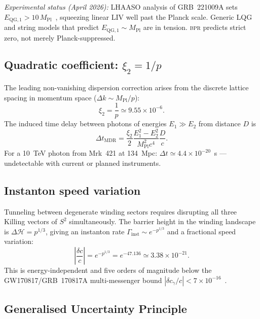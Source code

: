 \documentclass[aps,prd,twocolumn,superscriptaddress,longbibliography,nofootinbib]{revtex4-2}
\newcommand{\Stwo}{S^2}
\newcommand{\MPl}{M_{\mathrm{Pl}}}
\newcommand{\bpr}{\textsc{bpr}}
\newcommand{\abs}[1]{\left|#1\right|}
\begin{document}
\textit{Experimental status (April 2026):} LHAASO analysis of GRB~221009A
sets $E_{\mathrm{QG},1} > 10\,\MPl$~\cite{LHAASO2024}, squeezing linear LIV
well past the Planck scale.  Generic LQG and string models that predict
$E_{\mathrm{QG},1} \sim \MPl$ are in tension.  \bpr{} predicts strict zero,
not merely Planck-suppressed.

\subsection{Quadratic coefficient: $\xi_2 = 1/p$}

The leading non-vanishing dispersion correction arises from the discrete
lattice spacing in momentum space ($\Delta k \sim \MPl/p$):
\begin{equation}
\xi_2 = \frac{1}{p} \simeq 9.55 \times 10^{-6}.
\label{eq:xi2}
\end{equation}
The induced time delay between photons of energies $E_1 \gg E_2$ from
distance $D$ is
\begin{equation}
\Delta t_{\mathrm{MDR}} = \frac{\xi_2}{2}
  \frac{E_1^2 - E_2^2}{\MPl^2 c^4}\frac{D}{c}.
\end{equation}
For a 10~TeV photon from Mrk~421 at 134~Mpc: $\Delta t \simeq 4.4\times10^{-20}$~s
--- undetectable with current or planned instruments.

\subsection{Instanton speed variation}

Tunneling between degenerate winding sectors requires disrupting all three
Killing vectors of $\Stwo$ simultaneously.  The barrier height in the winding
landscape is $\Delta\mathcal{H} = p^{1/3}$, giving an instanton rate
$\Gamma_{\mathrm{inst}} \sim e^{-p^{1/3}}$ and a fractional speed variation:
\begin{equation}
\abs{\frac{\delta c}{c}} = e^{-p^{1/3}} = e^{-47.136}
  \simeq 3.38 \times 10^{-21}.
\label{eq:deltac}
\end{equation}
This is energy-independent and five orders of magnitude below the
GW170817/GRB~170817A multi-messenger bound
$|\delta c_\gamma / c| < 7\times10^{-16}$~\cite{Abbott2017}.

\subsection{Generalised Uncertainty Principle}
\end{document}
